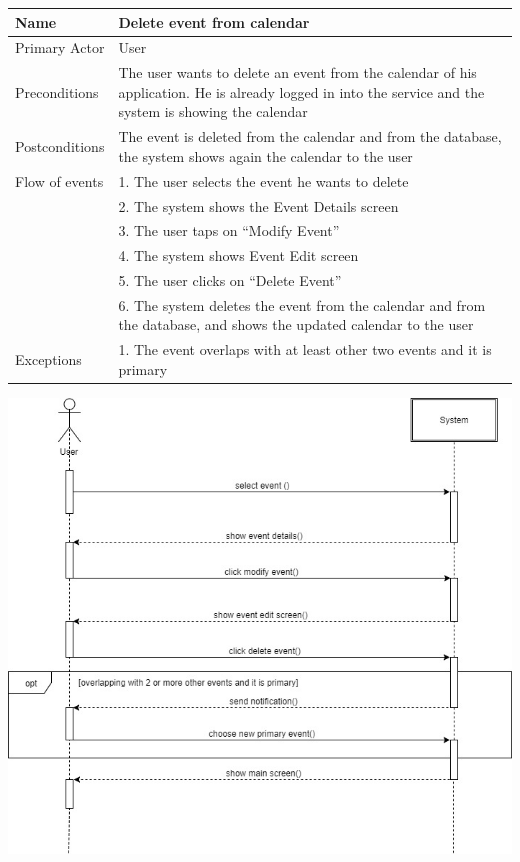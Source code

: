 \begin{center}
\def\arraystretch{1.25}
  \begin{tabular}{ | l | p{} | }
    \hline
    Name & Delete event from calendar \\ \hline
    Primary Actor & User \\ \hline
    Preconditions & The user wants to delete an event from the calendar of his application. He is already logged in into the service and the system is showing the calendar \\ \hline
    Postconditions & The event is deleted from the calendar and from the database, the system shows again the calendar to the user \\ \hline
    Flow of events  & 1.	The user selects the event he wants to delete \\
					& 2.	The system shows the Event Details screen \\
					& 3.	The user taps on “Modify Event” \\
					& 4.	The system shows Event Edit screen \\
					& 5.	The user clicks on “Delete Event” \\
					& 6.	The system deletes the event from the calendar and from the database, and shows the updated calendar to the user \\
 \hline    
    Exceptions  & 1.	The event overlaps with at least other two events and it is primary \\
 \hline
  \end{tabular}
\end{center}

\begin{center}
\includegraphics[scale=0.55]{MainMatter/images/sequencediagrams/delete}
\end{center}

